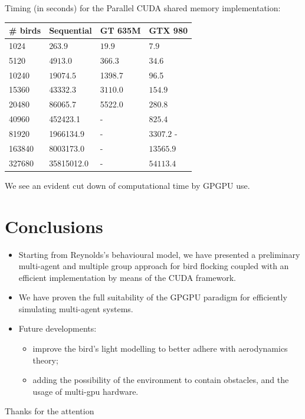 \documentclass{beamer}
\begin{document}
\begin{frame}
Timing (in seconds) for the Parallel CUDA shared memory implementation:
\begin{table} [h!]
	\centering
	\begin{tabular}{|l |l |l| l|}
	\hline
	\# birds & Sequential & GT	635M & GTX 980
	\\
	\hline
	
	1024  & \(263.9\) & $19.9$ & $7.9$  \\
	5120  & \(4913.0\) & $366.3$ & $34.6$  \\
	10240 &  $19074.5$ & 1398.7 & 96.5  \\
	15360  & \(43332.3\) & $3110.0$ & $154.9$  \\
	20480  & 86065.7 & 5522.0 & $280.8$ \\
	40960  & 452423.1 & - & $825.4$ \\
	81920  & 1966134.9 & - & $3307.2$ - \\
	163840  & 8003173.0 & - & $13565.9$ \\
	327680  & 35815012.0 & - & $54113.4$  \\
	\hline
	\end{tabular}
	\label{tab:ifdiv}
\end{table}
We see an evident cut down of computational time by GPGPU use.
\end{frame}
\section{Conclusions}
\begin{frame}
\begin{itemize}
\item Starting from Reynolds's behavioural model, we have 
presented a preliminary multi-agent and multiple group approach for bird flocking coupled with an efficient implementation by means of the CUDA framework.
\item We have proven the full suitability of the GPGPU paradigm for efficiently simulating multi-agent systems.
\item Future developments:
\begin{itemize}
\item improve the bird's light modelling to better adhere with aerodynamics theory;
\item adding the possibility of the environment to contain obstacles, and the usage of multi-gpu hardware.
\end{itemize}
\end{itemize}
\end{frame}

\begin{frame}
\begin{center}
\begin{huge}Thanks for the attention \end{huge}
\end{center}

\end{frame}
\end{document}
